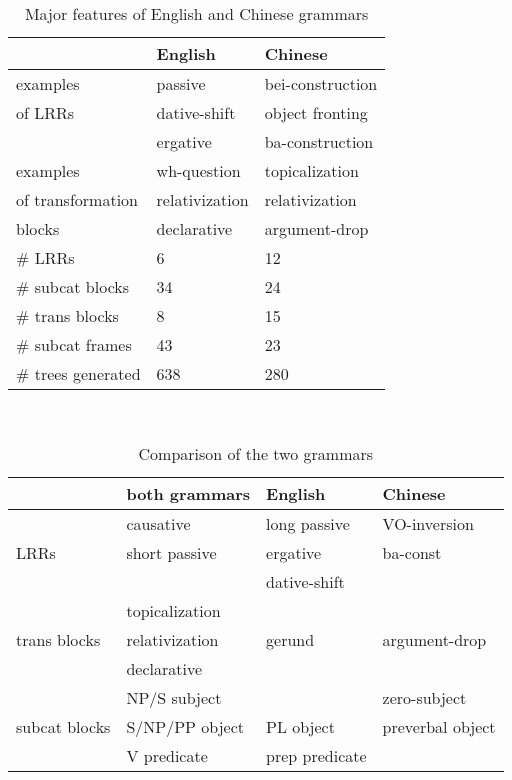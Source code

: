 \begin{table}[ht]
\centering
\begin{tabular}{|l|l|l|}     \hline
         & English & Chinese \\ \hline
examples     & passive       & bei-construction  \\
of LRRs         & dative-shift  & object fronting  \\ 
         & ergative  & ba-construction   \\ \hline
examples  & wh-question  & topicalization  \\
of transformation         & relativization & relativization \\
blocks         & declarative & argument-drop \\ \hline
\#  LRRs &   6     & 12  \\ \hline
\#  subcat blocks & 34 & 24 \\ \hline
\#  trans  blocks & 8  & 15 \\ \hline
\#  subcat frames  & 43 & 23 \\ \hline
\#  trees generated   & 638 & 280 \\ \hline
\end{tabular}  \\
\caption{Major features of English and Chinese grammars}
\label{table}
\end{table}

\begin{table}[ht]
\centering
\begin{tabular}{|l|l|l|l|}     \hline
         & both grammars & English & Chinese \\ \hline
         & causative & long passive &  VO-inversion \\
LRRs     & short passive & ergative  & ba-const \\
         &               & dative-shift  &       \\  \hline
         & topicalization  &  &   \\
trans blocks    & relativization & gerund & argument-drop \\
        & declarative &  &  \\ \hline
        & NP/S subject &  &  zero-subject \\
 subcat blocks & S/NP/PP object & PL object & preverbal object \\
               & V predicate &  prep predicate & \\ \hline
\end{tabular}  \\
\caption{Comparison of the two grammars}
\label{table2}
\end{table}



